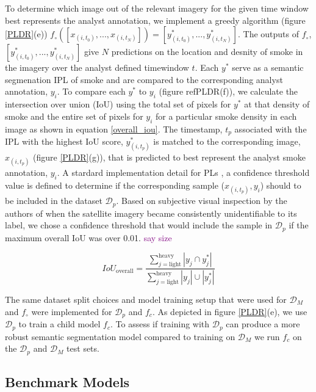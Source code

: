 \documentclass{article}
\newcommand\reynotes[1]{\textcolor{purple}{#1}}
\begin{document}
To determine which image out of the relevant imagery for the given time window best represents the analyst annotation, we implement a greedy algorithm (figure \ref{PLDR}(e)) \(f_\circ([x_{(i,t_0)},...,x_{(i,t_N)}])=[y^*_{(i,t_0)},...,y^*_{(i,t_N)}]\). The outputs of \(f_{\circ}\), \([y^*_{(i,t_0)},...,y^*_{(i,t_N)}]\) give \(N\) predictions on the location and desnity of smoke in the imagery over the analyst defined timewindow \(t\). Each \(y^*\) serve as a semantic segmenation IPL of smoke and are compared to the corresponding analyst annotation, \(y_i\). To compare each \(y^*\) to \(y_i\) (figure ref{PLDR}(f)), we calculate the intersection over union (IoU) using the total set of pixels for \(y^*\) at that density of smoke and the entire set of pixels for \(y_i\) for a particular smoke density in each image as shown in equation \ref{overall_iou}. The timestamp, \(t_p\) associated with the IPL with the highest IoU score, \(y^*_{(i,t_p)}\) is matched to the corresponding image, \(x_{(i,t_p)}\) (figure \ref{PLDR}(g)), that is predicted to best represent the analyst smoke annotation, \(y_i\). A stardard implementation detail for PLs \cite{conf_thresh}, a confidence threshold value is defined to determine if the corresponding sample (\(x_{(i, t_p)}, y_i\)) should to be included in the dataset \(\mathcal{D}_p\). Based on subjective visual inspection by the authors of when the satellite imagery became consistently unidentifiable to its label, we chose a confidence threshold that would include the sample in \(\mathcal{D}_{p}\) if the maximum overall IoU was over 0.01. 
\reynotes{say size}

\begin{equation} \label{overall_iou}
    IoU_{\text{overall}} = \frac{\sum\limits_{j=\text{light}}^{\text{heavy}}|y_{j}\cap y^*_{j}|}{\sum\limits_{j=\text{light}}^{\text{heavy}}|y_{j}|\cup|y^*_{j}|}
\end{equation}



The same dataset split choices and model training setup that were used for \(\mathcal{D}_{M}\) and \(f_{\circ}\) were implemented for \(\mathcal{D}_p\) and \(f_c\). As depicted in figure \ref{PLDR}(e), we use \(\mathcal{D}_{p}\) to train a child model \(f_c\). To assess if training with \(\mathcal{D}_{p}\) can produce a more robust semantic segmentation model compared to training on \(\mathcal{D}_M\) we run \(f_c\) on the \(\mathcal{D}_{p}\) and \(\mathcal{D}_{M}\) test sets. 

\subsection{Benchmark Models}
\end{document}
